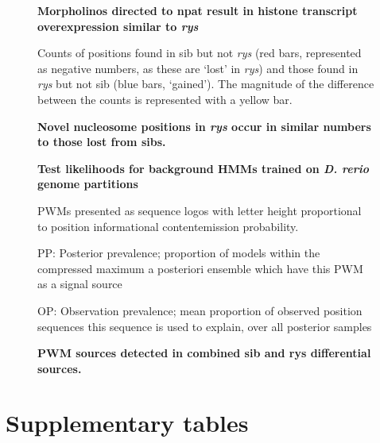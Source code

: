 \begin{figure}[!h]
    \caption{{\bf Morpholinos directed to npat result in histone transcript overexpression similar to \textit{rys}}} 
    \label{morpholinoRTPCR}
\end{figure}


\begin{figure}[!h]
    \caption{{\bf Novel nucleosome positions in \textit{rys} occur in similar numbers to those lost from sibs.}}
    Counts of positions found in sib but not \textit{rys} (red bars, represented as negative numbers, as these are `lost' in \textit{rys}) and those found in \textit{rys} but not sib (blue bars, `gained'). The magnitude of the difference between the counts is represented with a yellow bar.
    \label{diffposdist}
\end{figure}

\begin{figure}[!h]
    \caption{{\bf Test likelihoods for background HMMs trained on \textit{D. rerio} genome partitions}}
    \label{BHMMlh}
\end{figure}

\begin{figure}[!h]
    \caption{{\bf PWM sources detected in combined sib and rys differential sources.}}
    PWMs presented as sequence logos with letter height proportional to position informational content\/emission probability.
    
    PP: Posterior prevalence; proportion of models within the compressed maximum a posteriori ensemble which have this PWM as a signal source

    OP: Observation prevalence; mean proportion of observed position sequences this sequence is used to explain, over all posterior samples
    \label{combinedmotifs}
\end{figure}

\FloatBarrier

\section{Supplementary tables}

